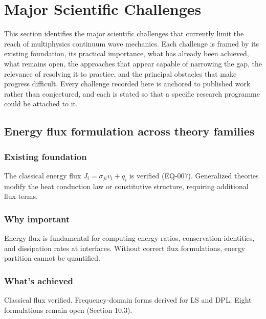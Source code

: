 \section{Major Scientific Challenges}
\label{sec:challenges}

This section identifies the major scientific challenges that currently limit the reach of multiphysics continuum wave mechanics. Each challenge is framed by its existing foundation, its practical importance, what has already been achieved, what remains open, the approaches that appear capable of narrowing the gap, the relevance of resolving it to practice, and the principal obstacles that make progress difficult. Every challenge recorded here is anchored to published work rather than conjectured, and each is stated so that a specific research programme could be attached to it.

\subsection{Energy flux formulation across theory families}
\label{sec:15.1}

\subsubsection{Existing foundation}

The classical energy flux $J_i = \sigma_{ji}v_i + q_i$ is verified (EQ-007). Generalized theories modify the heat conduction law or constitutive structure, requiring additional flux terms.

\subsubsection{Why important}

Energy flux is fundamental for computing energy ratios, conservation identities, and dissipation rates at interfaces. Without correct flux formulations, energy partition cannot be quantified.

\subsubsection{What's achieved}

Classical flux verified. Frequency-domain forms derived for LS and DPL. Eight formulations remain open (Section 10.3).

